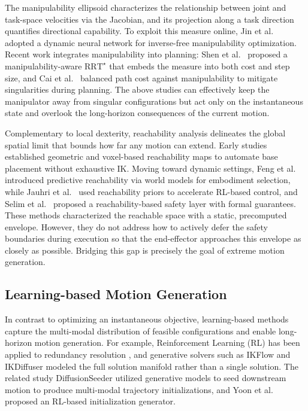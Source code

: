 \documentclass[journal, twoside]{IEEEtran}
\begin{document}
The manipulability ellipsoid \cite{yoshikawa1985manipulability} characterizes the relationship between joint and task-space velocities via the Jacobian, and its projection along a task direction quantifies directional capability. To exploit this measure online, Jin et al.~\cite{jin2017manipulability} adopted a dynamic neural network for inverse-free manipulability optimization. Recent work integrates manipulability into planning: Shen et al.~\cite{shen2023adaptive} proposed a manipulability-aware $\text{RRT}^{\star}$ that embeds the measure into both cost and step size, and Cai et al.~\cite{cai2025just} balanced path cost against manipulability to mitigate singularities during planning. The above studies can effectively keep the manipulator away from singular configurations but act only on the instantaneous state and overlook the long-horizon consequences of the current motion.

Complementary to local dexterity, reachability analysis delineates the global spatial limit that bounds how far any motion can extend. Early studies established geometric \cite{yang2009placement} and voxel-based \cite{makhal2018reuleaux} reachability maps to automate base placement without exhaustive IK. Moving toward dynamic settings, Feng et al.~\cite{feng2025predictive} introduced predictive reachability via world models for embodiment selection, while Jauhri et al.~\cite{jauhri2022robot} used reachability priors to accelerate RL-based control, and Selim et al.~\cite{selim2022safe} proposed a reachability-based safety layer with formal guarantees. These methods characterized the reachable space with a static, precomputed envelope. However, they do not address how to actively defer the safety boundaries during execution so that the end-effector approaches this envelope as closely as possible. Bridging this gap is precisely the goal of extreme motion generation.

\subsection{Learning-based Motion Generation}
In contrast to optimizing an instantaneous objective, learning-based methods capture the multi-modal distribution of feasible configurations and enable long-horizon motion generation. For example, Reinforcement Learning (RL) has been applied to redundancy resolution \cite{malik2022deep}, and generative solvers such as IKFlow \cite{ames2022ikflow} and IKDiffuser \cite{zhang2025ikdiffuser} modeled the full solution manifold rather than a single solution. The related study DiffusionSeeder \cite{huang2024diffusionseeder} utilized generative models to seed downstream motion to produce multi-modal trajectory initializations, and Yoon et al.~\cite{yoon2023learning} proposed an RL-based initialization generator.
\end{document}
